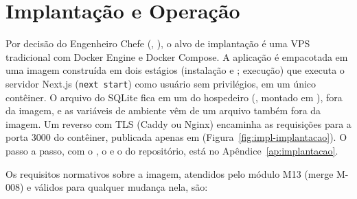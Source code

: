 
\section{Implantação e Operação}\label{sec:arq-implantacao}

Por decisão do Engenheiro Chefe (, ), o alvo de implantação é uma VPS tradicional com Docker Engine e Docker Compose. A aplicação é empacotada em uma imagem construída em dois estágios (instalação e ; execução) que executa o servidor Next.js (\texttt{next start}) como usuário sem privilégios, em um único contêiner. O arquivo do SQLite fica em um  do hospedeiro (, montado em ), fora da imagem, e as variáveis de ambiente vêm de um arquivo  também fora da imagem. Um  reverso com TLS (Caddy ou Nginx) encaminha as requisições para a porta 3000 do contêiner, publicada apenas em  (Figura~\ref{fig:impl-implantacao}). O passo a passo, com o , o  e o  do repositório, está no Apêndice~\ref{ap:implantacao}.


Os requisitos normativos sobre a imagem, atendidos pelo módulo M13 (merge M-008) e válidos para qualquer mudança nela, são:

